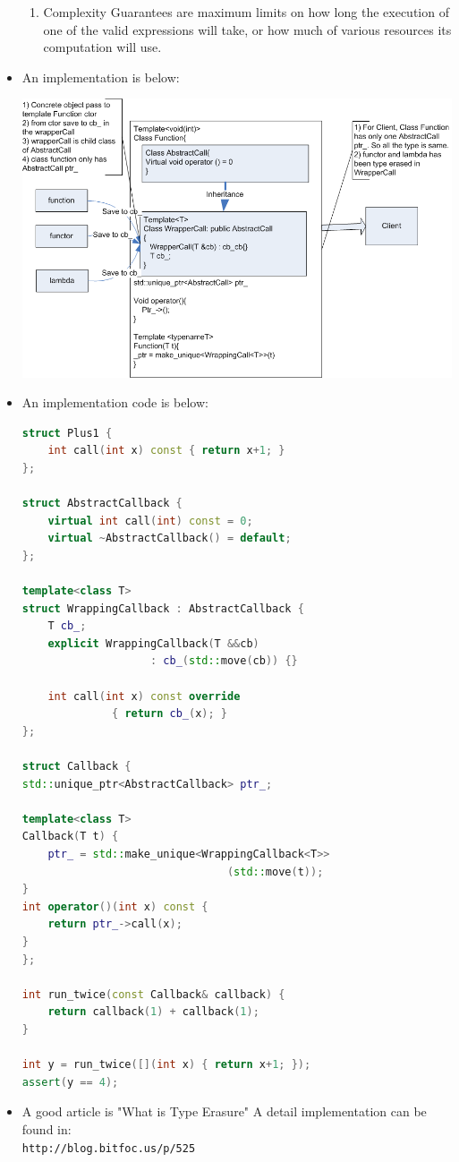 \documentclass[a4paper,11pt,twoside]{book}
\begin{document}
\begin{itemize}
\begin{enumerate}
	\item Complexity Guarantees are maximum limits on how long the execution of one of the valid expressions will take, or how much of various resources its computation will use.
\end{enumerate}


\item An implementation is below:

\includegraphics[scale=0.9]{pics/function1.png}

\item An implementation code is below:
\begin{lstlisting}[frame=single, language=c++]
struct Plus1 {
	int call(int x) const { return x+1; }
};

struct AbstractCallback {
	virtual int call(int) const = 0;
	virtual ~AbstractCallback() = default;
};

template<class T>
struct WrappingCallback : AbstractCallback {
	T cb_;
	explicit WrappingCallback(T &&cb) 
	                : cb_(std::move(cb)) {}
	                
	int call(int x) const override 
	          { return cb_(x); }
};

struct Callback {
std::unique_ptr<AbstractCallback> ptr_;

template<class T>
Callback(T t) {
	ptr_ = std::make_unique<WrappingCallback<T>>
	                            (std::move(t));
}
int operator()(int x) const {
	return ptr_->call(x);
}
};

int run_twice(const Callback& callback) {
	return callback(1) + callback(1);
}

int y = run_twice([](int x) { return x+1; });
assert(y == 4);
\end{lstlisting}
\item A good article is "What is Type Erasure" A detail implementation can be found in:\\ \verb|http://blog.bitfoc.us/p/525|
\end{itemize}
\end{document}
